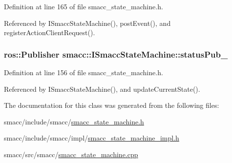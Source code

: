 Definition at line 165 of file smacc\+\_\+state\+\_\+machine.\+h.



Referenced by I\+Smacc\+State\+Machine(), post\+Event(), and register\+Action\+Client\+Request().

\subsubsection[{\texorpdfstring{status\+Pub\+\_\+}{statusPub_}}]{\setlength{\rightskip}{0pt plus 5cm}ros\+::\+Publisher smacc\+::\+I\+Smacc\+State\+Machine\+::status\+Pub\+\_\+\hspace{0.3cm}{\ttfamily [private]}}\hypertarget{classsmacc_1_1ISmaccStateMachine_a7360ef485d5c83a3811dfe3eaa3a0c20}{}\label{classsmacc_1_1ISmaccStateMachine_a7360ef485d5c83a3811dfe3eaa3a0c20}


Definition at line 156 of file smacc\+\_\+state\+\_\+machine.\+h.



Referenced by I\+Smacc\+State\+Machine(), and update\+Current\+State().



The documentation for this class was generated from the following files\+:\begin{DoxyCompactItemize}
\item 
smacc/include/smacc/\hyperlink{smacc__state__machine_8h}{smacc\+\_\+state\+\_\+machine.\+h}\item 
smacc/include/smacc/impl/\hyperlink{smacc__state__machine__impl_8h}{smacc\+\_\+state\+\_\+machine\+\_\+impl.\+h}\item 
smacc/src/smacc/\hyperlink{smacc__state__machine_8cpp}{smacc\+\_\+state\+\_\+machine.\+cpp}\end{DoxyCompactItemize}
